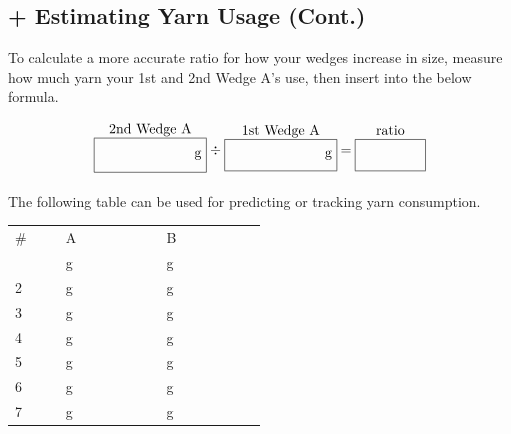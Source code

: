 \documentclass[12pt]{article}
\renewcommand{\arraystretch}{2} %
\newcommand{\blank}{\underline{\hspace{2em}} } %
\begin{document}
\begin{multicols}{2}

\section*{+ Estimating Yarn Usage (Cont.)}

To calculate a more accurate ratio for how your wedges increase in size, measure how much yarn your 1st and 2nd Wedge A's use, then insert into the below formula.

\vspace{-1em}
{\renewcommand{\arraystretch}{1.0}
\[
\left.\begin{matrix}
\text{2nd Wedge A} \\ 
\framebox(80,24){\hfill g~}
\end{matrix}\right.
\begin{matrix}\vspace{-1em}\\\div\end{matrix}
\left.\begin{matrix}
\text{1st Wedge A} \\ 
\framebox(80,22){\hfill g~}
\end{matrix}\right.
\begin{matrix}\vspace{-1em}\\=\end{matrix}
\left.\begin{matrix}
\text{ratio} \\ 
\framebox(50,22){~}
\end{matrix}\right.
\]}

The following table can be used for predicting or tracking yarn consumption.

\begin{center} \renewcommand{\arraystretch}{1.5}
\begin{tabular}{| C{0.1\linewidth} | C{0.2\linewidth} | C{0.2\linewidth} |}
\thickhline {} 
\#	& A 	& B 	\\ 	& \blank g	& \blank g	\\
2	& \blank g	& \blank g	\\
3	& \blank g	& \blank g	\\
4	& \blank g	& \blank g	\\
5	& \blank g	& \blank g	\\
6	& \blank g	& \blank g	\\
7	& \blank g	& \blank g	\\ \hline
\end{tabular}\end{center}
\columnbreak


\end{multicols}
\end{document}
